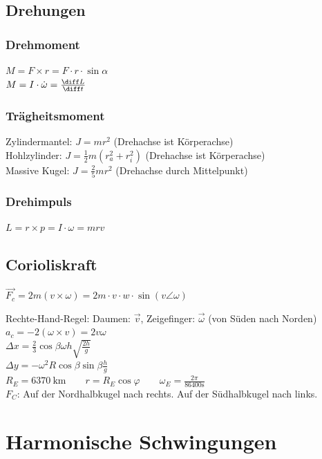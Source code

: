 \documentclass[german]{latex4ei/latex4ei_sheet}
\begin{document}
\subsection{Drehungen}
\subsubsection{Drehmoment}
$M=F\times r=F\cdot r\cdot \sin \alpha$\\
$M=I\cdot \dot{\omega}=\frac{\diff L}{\diff t}$
\subsubsection{Trägheitsmoment}
Zylindermantel: $J = mr^2$ (Drehachse ist Körperachse)\\
Hohlzylinder: $J = \frac{1}{2}m(r_a^2+r_i^2)$ (Drehachse ist Körperachse)\\
Massive Kugel: $J = \frac{2}{5}mr^2$ (Drehachse durch Mittelpunkt)\\
\subsubsection{Drehimpuls}
$L=r\times p=I\cdot \omega = mrv$
\begin{sectionbox}
\subsection{Corioliskraft}
\begin{emphbox}
$\vec{F_c}=2m(v\times \omega)= 2m \cdot v \cdot w	\cdot \sin{(v\angle \omega)}$
\end{emphbox}
Rechte-Hand-Regel: Daumen: $\vec{v}$, Zeigefinger: $\vec{\omega}$ (von Süden nach Norden)\\
$a_c=-2(\omega \times v)=2v\omega$\\
$\Delta x= \frac{2}{3}\cos \beta \omega h \sqrt{\frac{2h}{g}}$\\
$\Delta y = -\omega^2R\cos \beta \sin \beta \frac{h}{g}$\\
$R_E=\SI{6370}{\kilo \meter} \qquad r=R_E \cos \varphi \qquad \omega_E=\frac{2\pi}{86400\si{\second}}$\\
$F_C$: Auf der Nordhalbkugel nach rechts. Auf der Südhalbkugel nach links.
\end{sectionbox}

\section{Harmonische Schwingungen}
\end{document}
